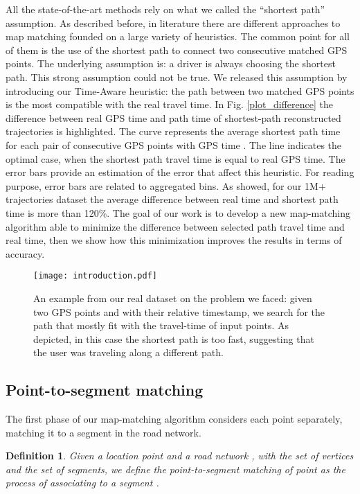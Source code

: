 \documentclass[5p]{elsarticle}
\newtheorem{definition}{Definition}
\begin{document}
All the state-of-the-art methods rely on what we called the ``shortest path'' assumption. As described before, in literature there are different approaches to map matching founded on a large variety of heuristics. The common point for all of
them is the use of the shortest path to connect two consecutive matched GPS points. The underlying assumption is: a driver is always choosing the shortest path. This strong assumption could not be true. We released 
this assumption by introducing our Time-Aware heuristic: the path between two matched GPS points is the most compatible with the real travel time. 
In Fig. \ref{plot_difference} the difference between real GPS time and path time of shortest-path reconstructed trajectories is highlighted. 
The curve represents the average shortest path time  for each pair of consecutive GPS points with GPS time . The line indicates the optimal case, when the shortest path travel time is equal to real GPS time.
The error bars provide an estimation of the error that affect this heuristic. For reading purpose, error bars are related to aggregated bins. As showed, for our 1M+ trajectories dataset the average difference between real time and shortest path time  is more than 120\%. 
The goal of our work is to develop a new map-matching algorithm able to minimize the difference between selected path travel time and real time, then we show how this minimization improves the results in terms of accuracy.

\begin{figure*}[t!]

\centering
\texttt{[image: introduction.pdf]}
\caption{An example from our real dataset on the problem we faced: given two GPS points  and  with their relative timestamp, we search for the path that mostly fit with the travel-time of input points. As depicted,
in this case the shortest path is too fast, suggesting that the user was traveling along a different path.}
\label{introduction_case}
\end{figure*}



\subsection{Point-to-segment matching}

The first phase of our map-matching algorithm considers each point separately, matching it to a segment in the road network.


\begin{definition}
Given a location point  and a road network , with  the set of vertices and  the set of segments, 
we define the point-to-segment matching of point  as the process of associating  to a segment . 
\end{definition}
\end{document}

